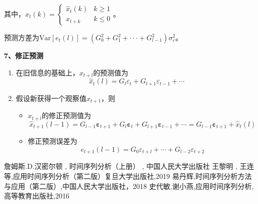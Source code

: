 \documentclass[12pt, a4paper, oneside]{ctexbook}
\begin{document}
其中，$\hat{x}_t(k) = \begin{cases}
        \hat{x}_t(k) & k \geq 1 \\
        x_{t+k}      & k \leq 0
    \end{cases}$。

预测方差为$\mathrm{Var}[e_t(l)]{=}(G_0^2+G_1^2+\cdotp\cdotp\cdotp+G_{l-1}^2)\sigma_\varepsilon^2$。

\textbf{7、修正预测}
\begin{enumerate}[1、]
    \item 在旧信息的基础上，$x_{t+l}$的预测值为
    \begin{equation*}
        \hat{x}_t(l)=G_l\varepsilon_t+G_{l+1}\varepsilon_{t-1}+\cdots 
    \end{equation*}
    \item 假设新获得一个观察值$x_{t+1}$，则
    \begin{itemize}
        \item $x_{t+l}$的修正预测值为
        \begin{equation*}
            \hat{x}_{t+1}(l-1)=G_{l-1}\boldsymbol{\varepsilon}_{t+1}+G_l\boldsymbol{\varepsilon}_t+G_{l+1}\boldsymbol{\varepsilon}_{t-1}+\cdots=G_{l-1}\boldsymbol{\varepsilon}_{t+1}+\hat{x}_t(l)
        \end{equation*}
        \item 修正预测误差为
            $$
                e_{t+1}(l-1)=G_0\varepsilon_{t+l}+\cdots+G_{l-2}\varepsilon_{t+2}
            $$
    \end{itemize}
\end{enumerate}






\begin{thebibliography}{4}
    詹姆斯.D.汉密尔顿 {,} 时间序列分析（上册） {,} 中国人民大学出版社
    王黎明 {,} 王连等{,}应用时间序列分析（第二版）复旦大学出版社{,}2019
    易丹辉{,}时间序列分析方法与应用（第二版）{,}中国人民大学出版社，2018
    史代敏{,}谢小燕{,}应用时间序列分析{,}高等教育出版社{,}2016
\end{thebibliography}

\appendix
\end{document}
